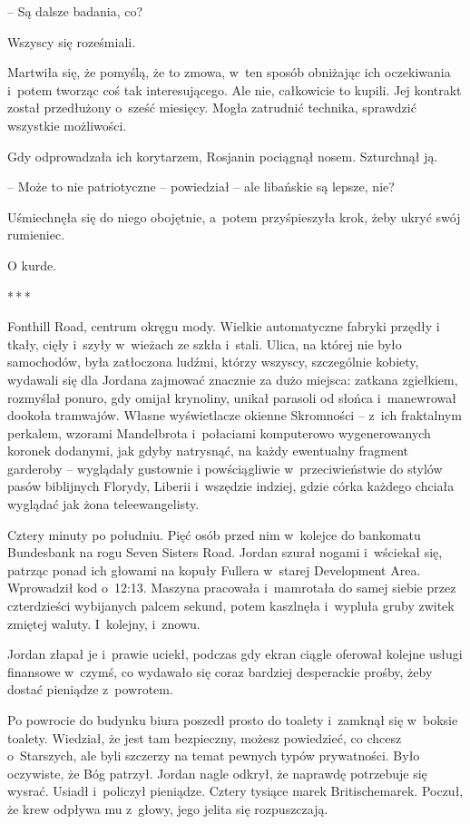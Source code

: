 \documentclass[oneside,polish,11pt,sfheadings]{mwbk}
\newcommand{\threeast}{\bigskip\par\centerline{*\,*\,*}\medskip\par}%
\begin{document}
-- Są dalsze badania, co?

Wszyscy się roześmiali.

Martwiła się, że pomyślą, że to zmowa, w~ten sposób obniżając ich
oczekiwania i~potem tworząc coś tak interesującego. Ale nie, całkowicie
to kupili. Jej kontrakt został przedłużony o~sześć miesięcy. Mogła
zatrudnić technika, sprawdzić wszystkie możliwości.

Gdy odprowadzała ich korytarzem, Rosjanin pociągnął nosem. Szturchnął
ją.

-- Może to nie patriotyczne -- powiedział -- ale libańskie są lepsze, nie?

Uśmiechnęła się do niego obojętnie, a~potem przyśpieszyła krok, żeby
ukryć swój rumieniec.

O kurde.
  \threeast 

Fonthill Road, centrum okręgu mody. Wielkie automatyczne fabryki przędły
i tkały, cięły i~szyły w~wieżach ze szkła i~stali. Ulica, na której nie
było samochodów, była zatłoczona ludźmi, którzy wszyscy, szczególnie
kobiety, wydawali się dla Jordana zajmować znacznie za dużo miejsca:
zatkana zgiełkiem, rozmyślał ponuro, gdy omijał krynoliny, unikał
parasoli od słońca i~manewrował dookoła tramwajów. Własne wyświetlacze
okienne Skromności -- z~ich fraktalnym perkalem, wzorami Mandelbrota i~połaciami komputerowo wygenerowanych koronek dodanymi, jak gdyby
natrysnąć, na każdy ewentualny fragment garderoby -- wyglądały gustownie
i powściągliwie w~przeciwieństwie do stylów pasów biblijnych Florydy,
Liberii i~wszędzie indziej, gdzie córka każdego chciała wyglądać jak
żona teleewangelisty.

Cztery minuty po południu. Pięć osób przed nim w~kolejce do bankomatu
Bundesbank na rogu Seven Sisters Road. Jordan szurał nogami i~wściekał
się, patrząc ponad ich głowami na kopuły Fullera w~starej Development
Area. Wprowadził kod o~12:13. Maszyna pracowała i~mamrotała do samej
siebie przez czterdzieści wybijanych palcem sekund, potem kaszlnęła i~wypluła gruby zwitek zmiętej waluty. I~kolejny, i~znowu.

Jordan złapał je i~prawie uciekł, podczas gdy ekran ciągle oferował
kolejne usługi finansowe w~czymś, co wydawało się coraz bardziej
desperackie prośby, żeby dostać pieniądze z~powrotem.

Po powrocie do budynku biura poszedł prosto do toalety i~zamknął się w~boksie toalety. Wiedział, że jest tam bezpieczny, możesz powiedzieć, co
chcesz o~Starszych, ale byli szczerzy na temat pewnych typów
prywatności. Było oczywiste, że Bóg patrzył. Jordan nagle odkrył, że
naprawdę potrzebuje się wysrać. Usiadł i~policzył pieniądze. Cztery
tysiące marek Britischemarek. Poczuł, że krew odpływa mu z~głowy, jego
jelita się rozpuszczają.
\end{document}
